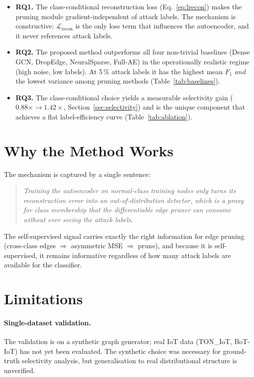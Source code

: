 \documentclass[11pt,a4paper]{report}
\theoremstyle{definition}
\theoremstyle{remark}
\begin{document}
\begin{itemize}[leftmargin=1.6em]
\item \textbf{RQ1.} The class-conditional reconstruction loss
(Eq.~\eqref{eq:lrecon}) makes the pruning module gradient-independent
of attack labels. The mechanism is constructive: $\mathcal{L}_{\text{recon}}$
is the only loss term that influences the autoencoder, and it never
references attack labels.

\item \textbf{RQ2.} The proposed method outperforms all four
non-trivial baselines (Dense GCN, DropEdge, NeuralSparse, Full-AE) in
the operationally realistic regime (high noise, low labels). At 5\,\%
attack labels it has the highest mean $F_1$ \emph{and} the lowest
variance among pruning methods (Table~\ref{tab:baselines}).

\item \textbf{RQ3.} The class-conditional choice yields a measurable
selectivity gain ($0.88\times\to 1.42\times$, Section~\ref{sec:selectivity})
and is the unique component that achieves a flat label-efficiency
curve (Table~\ref{tab:ablation}).
\end{itemize}

\section{Why the Method Works}

The mechanism is captured by a single sentence:
\begin{quote}\itshape
Training the autoencoder on normal-class training nodes only turns its
reconstruction error into an out-of-distribution detector, which is a
proxy for class membership that the differentiable edge pruner can
consume without ever seeing the attack labels.
\end{quote}
The self-supervised signal carries exactly the right information for
edge pruning (cross-class edges $\Rightarrow$ asymmetric MSE
$\Rightarrow$ prune), and because it is self-supervised, it remains
informative regardless of how many attack labels are available for the
classifier.

\section{Limitations}

\paragraph{Single-dataset validation.}
The validation is on a synthetic graph generator; real IoT data
(TON\_IoT, BoT-IoT) has not yet been evaluated. The synthetic choice was
necessary for ground-truth selectivity analysis, but generalisation to
real distributional structure is unverified.
\end{document}
